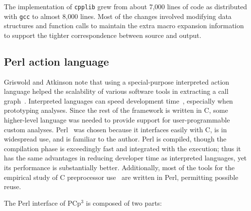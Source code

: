 \documentclass{article}
\newcommand{\pcp}{\mbox{\textsf{PCp}$^3$}}
\newcommand{\Cpp}{\mbox{\textsf{cpp}}}
\newcommand{\Perl}{\mbox{\textsf{Perl}}}
\newcommand{\C}{\mbox{\textsf{C}}}
\begin{document}

The implementation of \texttt{cpplib} grew from about 7,000 lines of
code as distributed with \texttt{gcc} to almost 8,000 lines.  Most of
the changes involved modifying data structures and function calls to
maintain the extra macro expansion information to support the
tighter correspondence between source and output.  

\subsection{Perl action language}

Griswold and Atkinson note that using a special-purpose interpreted
action language helped the scalability of various software tools in
extracting a call graph~\cite{Griswold96}.  Interpreted languages can
speed development time~\cite{Scripting}, especially when prototyping
analyses.  Since the rest of the framework is written in \C{}, some
higher-level language was needed to provide support for
user-programmable custom analyses.  \Perl{}~\cite{Perl,Camel} was chosen
because it interfaces easily with \C{}, is in widespread use, and is
familiar to the author. \Perl{} is compiled, though the compilation
phase is exceedingly fast and integrated with the execution; thus it has
the same advantages in reducing developer time as interpreted languages,
yet its performance is substantially better.  Additionally, most of the
tools for the empirical study of \C{} preprocessor use~\cite{EmpCpp}
are written in \Perl{}, permitting possible reuse.

The \Perl{} interface of \pcp{} is composed of two parts:
\end{document}
